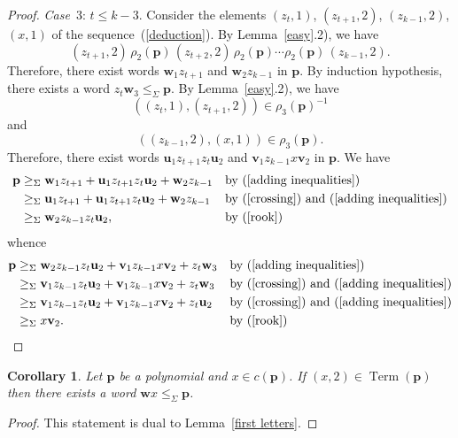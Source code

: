 \documentclass[12pt,draft]{amsart}
\newtheorem{corollary}{Corollary}
\DeclareMathOperator{\term}{Term}
\begin{document}
\begin{proof}
\emph{Case}~3: $t\le k-3$. Consider the elements $(z_t,1)$, $(z_{t+1},2)$, $(z_{k-1},2)$, $(x,1)$ of the sequence~(\ref{deduction}). By Lemma~\ref{easy}.2), we have
$$(z_{t+1},2)\,\rho_2(\mathbf p)\,(z_{t+2},2)\,\rho_2(\mathbf p)\cdots\rho_2(\mathbf p)\,(z_{k-1},2).$$
Therefore, there exist words $\mathbf w_1z_{t+1}$ and $\mathbf w_2z_{k-1}$ in $\mathbf p$. By induction hypothesis, there exists a word $z_t\mathbf w_3\le_{\Sigma}\mathbf p$. By Lemma~\ref{easy}.2), we have 
$$((z_t,1),(z_{t+1},2))\in\rho_3(\mathbf p)^{-1}$$ 
and 
$$((z_{k-1},2),(x,1))\in\rho_3(\mathbf p).$$ 
Therefore, there exist words $\mathbf u_1z_{t+1}z_t\mathbf u_2$ and $\mathbf v_1z_{k-1}x\mathbf v_2$ in $\mathbf p$. We have
\begin{align*}
\mathbf p&\ge_{\Sigma}\mathbf w_1z_{t+1}+\mathbf u_1z_{t+1}z_t\mathbf u_2+\mathbf w_2z_{k-1}&&\text{by~(\ref{adding inequalities})}\\
&\ge_{\Sigma}\mathbf u_1z_{t+1}+\mathbf u_1z_{t+1}z_t\mathbf u_2+\mathbf w_2z_{k-1}&&\text{by~(\ref{crossing}) and~(\ref{adding inequalities})}\\
&\ge_{\Sigma}\mathbf w_2z_{k-1}z_t\mathbf u_2,&&\text{by~(\ref{rook})}
\end{align*}
whence
\begin{align*}
\mathbf p&\ge_{\Sigma}\mathbf w_2z_{k-1}z_t\mathbf u_2+\mathbf v_1z_{k-1}x\mathbf v_2+z_t\mathbf w_3&&\text{by~(\ref{adding inequalities})}\\
&\ge_{\Sigma}\mathbf v_1z_{k-1}z_t\mathbf u_2+\mathbf v_1z_{k-1}x\mathbf v_2+z_t\mathbf w_3&&\text{by~(\ref{crossing}) and~(\ref{adding inequalities})}\\
&\ge_{\Sigma}\mathbf v_1z_{k-1}z_t\mathbf u_2+\mathbf v_1z_{k-1}x\mathbf v_2+z_t\mathbf u_2&&\text{by~(\ref{crossing}) and~(\ref{adding inequalities})}\\
&\ge_{\Sigma}x\mathbf v_2.&&\text{by~(\ref{rook})}
\end{align*}
\end{proof}

\begin{corollary}
\label{last letters} Let $\mathbf p$ be a polynomial and $x\in c(\mathbf p)$. If $(x,2)\in\term(\mathbf p)$ then there exists a word $\mathbf wx\le_{\Sigma}\mathbf p$.
\end{corollary}
\begin{proof}
This statement is dual to Lemma~\ref{first letters}.
\end{proof}
\end{document}
